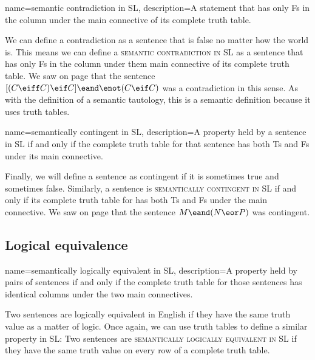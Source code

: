 {
name=semantic contradiction in SL,
description={A statement that has only Fs in the column under the main connective of its complete truth table.}
}

We can define a contradiction as a sentence that is false no matter how the world is. This means we can define a \textsc{\gls{semantic contradiction in SL}} \label{def:semantic_contradiction_in_sl} as a sentence that has only Fs in the column under them main connective of its complete truth table. We saw on page \pageref{contradiction3.1} that the sentence $[(C\eiff C) \eif C] \eand \enot(C \eif C)$ was a contradiction in this sense. As with the definition of a semantic tautology, this is a semantic definition because it uses truth tables. 
		
{
name=semantically contingent in SL,
description={A property held by a sentence in SL if and only if the complete truth table for that sentence has both Ts and Fs under its main connective.}
}

Finally, we will define a sentence as contingent if it is sometimes true and sometimes false. Similarly, a sentence is \textsc{\gls{semantically contingent in SL}} \label{def:semantically_contingent_in_sl} if and only if its complete truth table for has both Ts and Fs under the main connective. We saw on page \pageref{contingentsentence3.1} that the sentence $M \eand (N \eor P)$ was contingent.

\subsection{Logical equivalence}

{
name=semantically logically equivalent in SL,
description={A property held by pairs of sentences if and only if the complete truth table for those sentences has identical columns under the two main connectives.}
}

Two sentences are logically equivalent in English if they have the same truth value as a matter of logic. Once again, we can use truth tables to define a similar property in SL: Two sentences are \textsc{\gls{semantically logically equivalent in SL}} \label{def:semantically_logically_equivalent_in_sl} if they have the same truth value on every row of a complete truth table.

